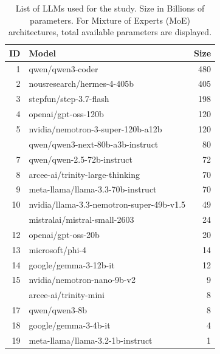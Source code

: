 \begin{table}[t]
\centering
\caption{\label{tab:llm_list}List of LLMs used for the study. Size in Billions of parameters. For Mixture of Experts (MoE) \cite{SMMD+17} architectures, total available parameters are displayed.}
\centering
\fontsize{8}{10}\selectfont
\begin{tabular}[t]{rlr}
\toprule
ID & Model & Size\\
\midrule
1 & qwen/qwen3-coder & 480\\
2 & nousresearch/hermes-4-405b & 405\\
3 & stepfun/step-3.7-flash & 198\\
4 & openai/gpt-oss-120b & 120\\
5 & nvidia/nemotron-3-super-120b-a12b & 120\\
\addlinespace
6 & qwen/qwen3-next-80b-a3b-instruct & 80\\
7 & qwen/qwen-2.5-72b-instruct & 72\\
8 & arcee-ai/trinity-large-thinking & 70\\
9 & meta-llama/llama-3.3-70b-instruct & 70\\
10 & nvidia/llama-3.3-nemotron-super-49b-v1.5 & 49\\
\addlinespace
11 & mistralai/mistral-small-2603 & 24\\
12 & openai/gpt-oss-20b & 20\\
13 & microsoft/phi-4 & 14\\
14 & google/gemma-3-12b-it & 12\\
15 & nvidia/nemotron-nano-9b-v2 & 9\\
\addlinespace
16 & arcee-ai/trinity-mini & 8\\
17 & qwen/qwen3-8b & 8\\
18 & google/gemma-3-4b-it & 4\\
19 & meta-llama/llama-3.2-1b-instruct & 1\\
\bottomrule
\end{tabular}
\end{table}